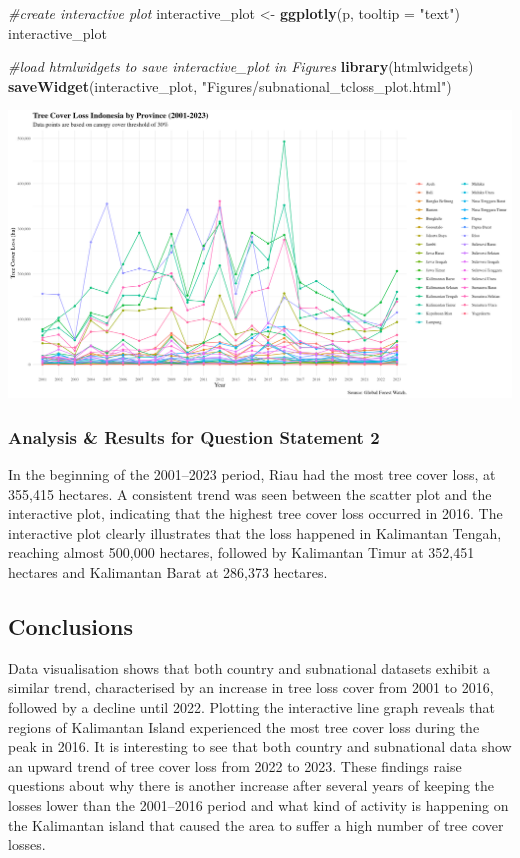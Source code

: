 \documentclass[
]{article}
\newenvironment{Shaded}{\begin{snugshade}}{\end{snugshade}}
\newcommand{\AttributeTok}[1]{\textcolor[rgb]{0.13,0.29,0.53}{#1}}
\newcommand{\CommentTok}[1]{\textcolor[rgb]{0.56,0.35,0.01}{\textit{#1}}}
\newcommand{\FunctionTok}[1]{\textcolor[rgb]{0.13,0.29,0.53}{\textbf{#1}}}
\newcommand{\NormalTok}[1]{#1}
\newcommand{\OtherTok}[1]{\textcolor[rgb]{0.56,0.35,0.01}{#1}}
\newcommand{\StringTok}[1]{\textcolor[rgb]{0.31,0.60,0.02}{#1}}
\begin{document}
\begin{Shaded}
\begin{Highlighting}[]
\CommentTok{\#create interactive plot}
\NormalTok{interactive\_plot }\OtherTok{\textless{}{-}} \FunctionTok{ggplotly}\NormalTok{(p, }\AttributeTok{tooltip =} \StringTok{"text"}\NormalTok{)}
\NormalTok{interactive\_plot}

\CommentTok{\#load htmlwidgets to save interactive\_plot in \textquotesingle{}Figures\textquotesingle{}}
\FunctionTok{library}\NormalTok{(htmlwidgets)}
\FunctionTok{saveWidget}\NormalTok{(interactive\_plot, }\StringTok{"Figures/subnational\_tcloss\_plot.html"}\NormalTok{)}
\end{Highlighting}
\end{Shaded}

\includegraphics{Figures/subnational_figure1.jpg}

\subsubsection{Analysis \& Results for Question Statement
2}\label{analysis-results-for-question-statement-2}

In the beginning of the 2001--2023 period, Riau had the most tree cover
loss, at 355,415 hectares. A consistent trend was seen between the
scatter plot and the interactive plot, indicating that the highest tree
cover loss occurred in 2016. The interactive plot clearly illustrates
that the loss happened in Kalimantan Tengah, reaching almost 500,000
hectares, followed by Kalimantan Timur at 352,451 hectares and
Kalimantan Barat at 286,373 hectares.

\subsection{Conclusions}\label{conclusions}

Data visualisation shows that both country and subnational datasets
exhibit a similar trend, characterised by an increase in tree loss cover
from 2001 to 2016, followed by a decline until 2022. Plotting the
interactive line graph reveals that regions of Kalimantan Island
experienced the most tree cover loss during the peak in 2016. It is
interesting to see that both country and subnational data show an upward
trend of tree cover loss from 2022 to 2023. These findings raise
questions about why there is another increase after several years of
keeping the losses lower than the 2001--2016 period and what kind of
activity is happening on the Kalimantan island that caused the area to
suffer a high number of tree cover losses.
\end{document}

